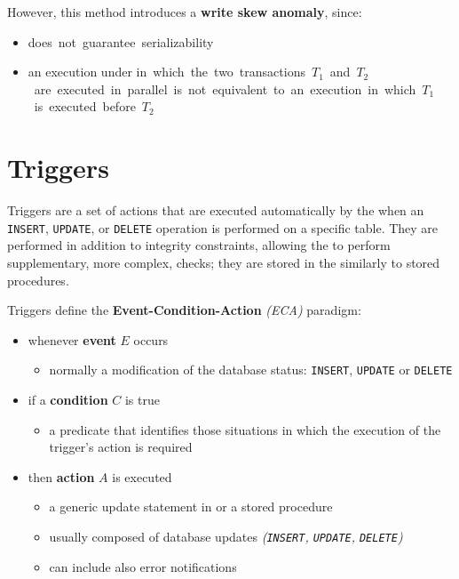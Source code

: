 \documentclass[english]{article}
\begin{document}
\bigskip
However, this method introduces a \textbf{write skew anomaly}, since:

\begin{itemize}
  \item \si does not guarantee serializability
  \item an execution under \si in which the two transactions \(T_1\) and \(T_2\) are executed in parallel is not equivalent to an execution in which \(T_1\) is executed before \(T_2\)
\end{itemize}

\clearpage

\section{Triggers}

Triggers are a set of actions that are executed automatically by the \dbms when an \texttt{INSERT}, \texttt{UPDATE}, or \texttt{DELETE} operation is performed on a specific table.
They are performed in addition to integrity constraints, allowing the \dbms to perform supplementary, more complex, checks;
they are stored in the \dbms similarly to stored procedures.

Triggers define the \textbf{Event-Condition-Action} \textit{(ECA)} paradigm:

\begin{itemize}
  \item whenever \textbf{event} \(E\) occurs
        \begin{itemize}[label=\(\rightarrow\)]
          \item normally a modification of the database status: \texttt{INSERT}, \texttt{UPDATE} or \texttt{DELETE}
        \end{itemize}
  \item if a \textbf{condition} \(C\) is true
        \begin{itemize}
          \item a predicate that identifies those situations in which the execution of the trigger's action is required
        \end{itemize}
  \item then \textbf{action} \(A\) is executed
        \begin{itemize}[label=\(\rightarrow\)]
          \item a generic update statement in or a stored procedure
          \item usually composed of database updates \textit{(\texttt{INSERT}, \texttt{UPDATE}, \texttt{DELETE})}
          \item can include also error notifications
        \end{itemize}
\end{itemize}
\end{document}
